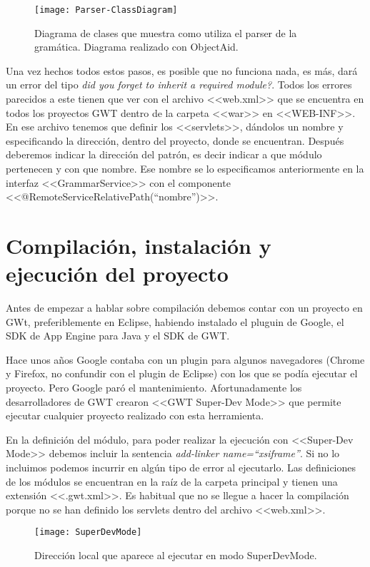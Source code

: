 \begin{figure}
\centering
\texttt{[image: Parser-ClassDiagram]}
\caption{Diagrama de clases que muestra como utiliza el parser de la gramática. Diagrama realizado con ObjectAid.}
\label{fig:5.3}
\end{figure}

Una vez hechos todos estos pasos, es posible que no funciona nada, es más, dará un error del tipo \textit{did you forget to inherit a required module?}. Todos los errores parecidos a este tienen que ver con el archivo <<web.xml>> que se encuentra en todos los proyectos GWT dentro de la carpeta <<war>> en <<WEB-INF>>. En ese archivo tenemos que definir los <<servlets>>, dándolos un nombre y especificando la dirección, dentro del proyecto, donde se encuentran. Después deberemos indicar la dirección del patrón, es decir indicar a que módulo pertenecen y con que nombre. Ese nombre se lo especificamos anteriormente en la interfaz <<GrammarService>> con el componente <<@RemoteServiceRelativePath(``nombre'')>>.

\section{Compilación, instalación y ejecución del proyecto}

Antes de empezar a hablar sobre compilación debemos contar con un proyecto en GWt, preferiblemente en Eclipse, habiendo instalado el pluguin de Google, el SDK de App Engine para Java y el SDK de GWT.

Hace unos años Google contaba con un plugin para algunos navegadores (Chrome y Firefox, no confundir con el plugin de Eclipse) con los que se podía ejecutar el proyecto. Pero Google paró el mantenimiento. Afortunadamente los desarrolladores de GWT crearon <<GWT Super-Dev Mode>> que permite ejecutar cualquier proyecto realizado con esta herramienta.

En la definición del módulo, para poder realizar la ejecución con <<Super-Dev Mode>> debemos incluir la sentencia \textit{add-linker name=``xsiframe''}. Si no lo incluimos podemos incurrir en algún tipo de error al ejecutarlo.
Las definiciones de los módulos se encuentran en la raíz de la carpeta principal y tienen una extensión <<.gwt.xml>>. Es habitual que no se llegue a hacer la compilación porque no se han definido los servlets dentro del archivo <<web.xml>>.
  
\begin{figure}
\centering
\texttt{[image: SuperDevMode]}
\caption{Dirección local que aparece al ejecutar en modo SuperDevMode.}
\label{fig:5.4}
\end{figure}

